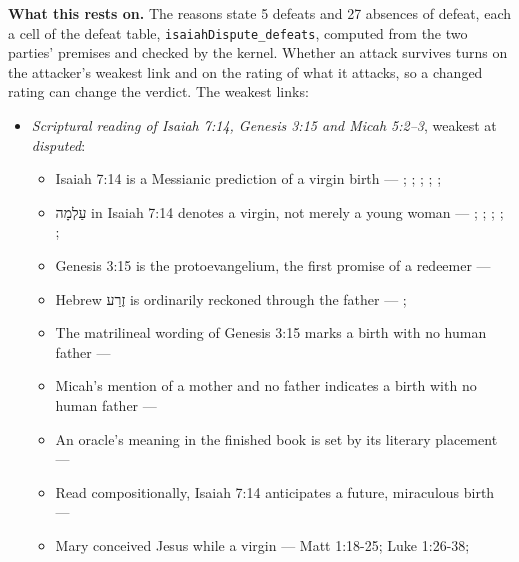 \documentclass[11pt]{article}
\begin{document}
\par\noindent\textbf{What this rests on.} The reasons state 5 defeats and 27 absences of defeat, each a cell of the defeat table, \texttt{isaiah\allowbreak{}Dispute\_\allowbreak{}defeats}, computed from the two parties' premises and checked by the kernel. Whether an attack survives turns on the attacker's weakest link and on the rating of what it attacks, so a changed rating can change the verdict. The weakest links:
\begin{itemize}
\item \emph{Scriptural reading of Isaiah 7:14, Genesis 3:15 and Micah 5:2–3}, weakest at \emph{disputed}:
\begin{itemize}
\item Isaiah 7:14 is a Messianic prediction of a virgin birth --- \cite[ad loc. Isa 7:14]{motyer-isaiah-1993}; \cite[123]{motyer-context-content-1970}; \cite[12--14]{compton-immanuel-prophecy-2007}; \cite[66]{justin-dialogue-with-trypho-160}; \cite[III.21.6]{irenaeus-against-heresies-180}; \cite[I.35]{origen-against-celsus-248}
\item עַלְמָה in Isaiah 7:14 denotes a virgin, not merely a young woman --- \cite[ad loc. Isa 7:14]{motyer-isaiah-1993}; \cite[app. Isa 7:14]{bhs-1997}; \cite[1653--1654]{berry-virgin-birth-2003}; \cite[125]{motyer-context-content-1970}; \cite[7--8]{compton-immanuel-prophecy-2007}; \cite[I.32]{jerome-against-jovinianus-393}
\item Genesis 3:15 is the protoevangelium, the first promise of a redeemer --- \cite[9--10]{miravalle-meet-mary-2007}
\item Hebrew זֶרַע is ordinarily reckoned through the father --- \cite[9--10]{miravalle-meet-mary-2007}; \cite[app. Gen 3:15]{bhs-1997}
\item The matrilineal wording of Genesis 3:15 marks a birth with no human father --- \cite[9--10]{miravalle-meet-mary-2007}
\item Micah's mention of a mother and no father indicates a birth with no human father --- \cite[9--10]{miravalle-meet-mary-2007}
\item An oracle's meaning in the finished book is set by its literary placement --- \cite[483--486]{postell-isaiah-messianic-2025}
\item Read compositionally, Isaiah 7:14 anticipates a future, miraculous birth --- \cite[490--493]{postell-isaiah-messianic-2025}
\item Mary conceived Jesus while a virgin --- Matt 1:18-25; Luke 1:26-38; \cite[30--33]{brown-problem-virginal-conception-1972}

\end{itemize}
\end{itemize}
\end{document}
